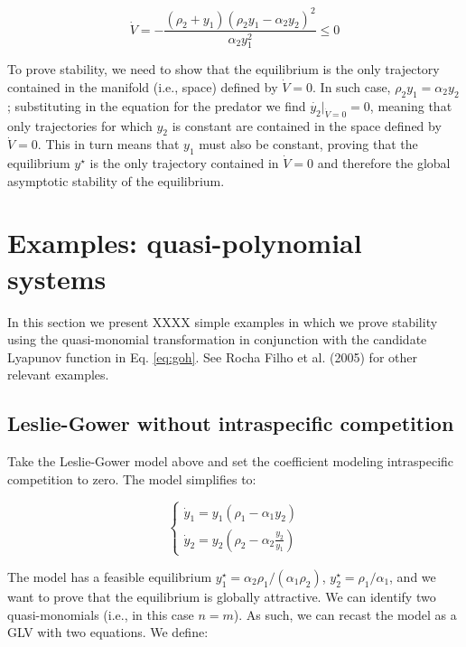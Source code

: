 \documentclass{article}
\begin{document}
\begin{cb}
\begin{equation}
\dot{V} = -\frac{(\rho_2 + y_1) (\rho_2 y_1 - \alpha_2 y_2)^2}{\alpha_2 y_1^2} \leq 0
\end{equation}

To prove stability, we need to show that the equilibrium is the only trajectory contained in the manifold (i.e., space) defined by $\dot{V} = 0$. In such case, $\rho_2 y_1 = \alpha_2 y_2$; substituting in the equation for the predator we find $\dot{y_2}|_{\dot{V} = 0} = 0$, meaning that only trajectories for which $y_2$ is constant are contained in the space defined by $\dot{V} = 0$. This in turn means that $y_1$ must also be constant, proving that the equilibrium $y^\star$ is the only trajectory contained in $\dot{V} = 0$ and therefore the global asymptotic stability of the equilibrium.
\end{cb}

\hypertarget{examples-quasi-polynomial-systems}{%
\section{Examples: quasi-polynomial
systems}\label{examples-quasi-polynomial-systems}}

In this section we present XXXX simple examples in which we prove
stability using the quasi-monomial transformation in conjunction with
the candidate Lyapunov function in Eq. \ref{eq:goh}. See Rocha Filho et
al. (2005) for other relevant examples.

\hypertarget{leslie-gower-without-intraspecific-competition}{%
\subsection{Leslie-Gower without intraspecific
competition}\label{leslie-gower-without-intraspecific-competition}}

\label{sec:lgnosr}

Take the Leslie-Gower model above and set the coefficient modeling
intraspecific competition to zero. The model simplifies to:

\begin{equation}
\label{eq:lgnosr}
\begin{cases}
\dot{y}_1 = y_1 (\rho_1 - \alpha_1 y_2)\\
\dot{y}_2 = y_2 \left(\rho_2 - \alpha_2 \frac{y_2}{y_1} \right)
\end{cases}
\end{equation}

The model has a feasible equilibrium
\(y_1^\star = \alpha_2 \rho_1 / (\alpha_1 \rho_2)\),
\(y_2^\star = \rho_1 / \alpha_1\), and we want to prove that the
equilibrium is globally attractive. We can identify two quasi-monomials
(i.e., in this case \(n = m\)). As such, we can recast the model as a
GLV with two equations. We define:
\end{document}
